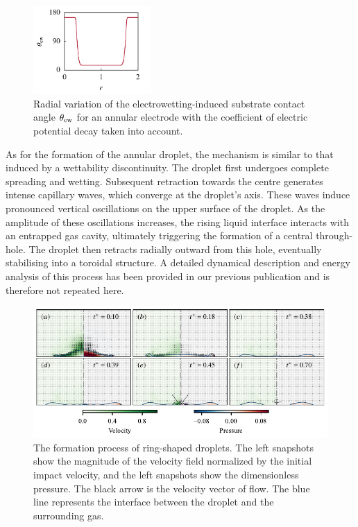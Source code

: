 \documentclass[lineno]{cls/jfm}
\begin{document}
 \begin{figure}
  \centerline{\includegraphics[width=0.4\textwidth]{fig/ring_theta.pdf}}
  \caption{Radial variation of the electrowetting-induced substrate contact angle $\theta_{\rm ew}$ for an annular electrode with the coefficient of electric potential decay taken into account.}
 \label{fig:ring_theta}
 \end{figure}

 As for the formation of the annular droplet, the mechanism is similar to that induced by a wettability discontinuity. The droplet first undergoes complete spreading and wetting. Subsequent retraction towards the centre generates intense capillary waves, which converge at the droplet's axis. These waves induce pronounced vertical oscillations on the upper surface of the droplet. As the amplitude of these oscillations increases, the rising liquid interface interacts with an entrapped gas cavity, ultimately triggering the formation of a central through-hole. The droplet then retracts radially outward from this hole, eventually stabilising into a toroidal structure. A detailed dynamical description and energy analysis of this process has been provided in our previous publication and is therefore not repeated here.

 \begin{figure}
  \centerline{\includegraphics[width=1.0\textwidth]{fig/ring.pdf}}
  \caption{The formation process of ring-shaped droplets. The left snapshots show the magnitude of the velocity field normalized by the initial impact velocity, and the left snapshots show the dimensionless pressure. The black arrow is the velocity vector of flow. The blue line represents the interface between the droplet and the surrounding gas.}
 \label{fig:ring}
 \end{figure}
\end{document}
